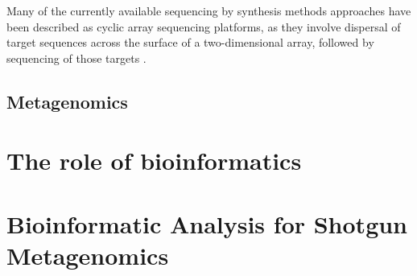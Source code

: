 Many of the currently available sequencing by synthesis methods approaches have been described as cyclic array sequencing platforms, as they involve dispersal of target sequences across the surface of a two-dimensional array, followed by sequencing of those targets \citep{hagemann_overview_2015}. 





\subsection{Metagenomics}


\section{The role of bioinformatics}


\section{Bioinformatic Analysis for Shotgun Metagenomics}


